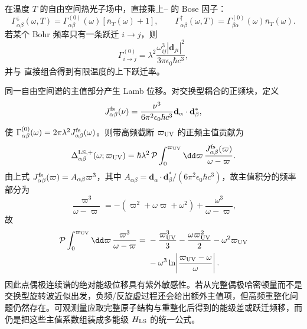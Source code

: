 \begin{exbox}[自由空间多能级电磁场]
在温度 $T$ 的自由空间热光子场中，直接乘上-- 的 Bose 因子：
\begin{equation}
\Gamma_{\alpha\beta}^{\downarrow}(\omega,T)
=\Gamma_{\alpha\beta}^{(0)}(\omega)
[\bar n_T(\omega)+1],
\qquad
\Gamma_{\alpha\beta}^{\uparrow}(\omega,T)
=\Gamma_{\beta\alpha}^{(0)}(\omega)
\bar n_T(\omega).
\label{eq:phys-oqs-free-space-thermal-matrix}
\end{equation}
若某个 Bohr 频率只有一条跃迁 $i\to j$，则
\begin{equation}
\Gamma_{i\to j}^{(0)}
=\lambda^2
\frac{\omega_{ij}^3|\mathbf d_{ji}|^2}
{3\pi\epsilon_0\hbar c^3},
\label{eq:phys-oqs-free-space-single-rate}
\end{equation}
并与 直接组合得到有限温度的上下跃迁率。

同一自由空间谱的主值部分产生 Lamb 位移。对交换型耦合的正频块，定义
\[
J_{\alpha\beta}^{\rm fs}(\nu)
=\frac{\nu^3}{6\pi^2\epsilon_0\hbar c^3}
\mathbf d_\alpha\cdot\mathbf d_\beta^*,
\]
使 $\Gamma_{\alpha\beta}^{(0)}(\omega)=2\pi\lambda^2J_{\alpha\beta}^{\rm fs}(\omega)$。则带高频截断 $\varpi_{\rm UV}$ 的正频主值贡献为
\begin{equation}
\Delta_{\alpha\beta}^{\rm LS,+}(\omega;\varpi_{\rm UV})
=\hbar\lambda^2\,\mathcal P
\int_0^{\varpi_{\rm UV}}\dd\varpi\,
\frac{J_{\alpha\beta}^{\rm fs}(\varpi)}{\omega-\varpi}.
\label{eq:phys-oqs-free-space-ls-general}
\end{equation}
由上式 $J_{\alpha\beta}^{\rm fs}(\varpi)=A_{\alpha\beta}\varpi^3$，其中 $A_{\alpha\beta}=\mathbf d_\alpha\cdot\mathbf d_\beta^*/(6\pi^2\epsilon_0\hbar c^3)$，故主值积分的频率部分为
\[
\frac{\varpi^3}{\omega-\varpi}
=-(\varpi^2+\omega\varpi+\omega^2)
+\frac{\omega^3}{\omega-\varpi},
\]
故
\[
\begin{aligned}
\mathcal P\int_0^{\varpi_{\rm UV}}\dd\varpi\,
\frac{\varpi^3}{\omega-\varpi}
={}&-\frac{\varpi_{\rm UV}^3}{3}
-\frac{\omega\varpi_{\rm UV}^2}{2}
-\omega^2\varpi_{\rm UV}\\
&-\omega^3
\ln\!\left|\frac{\varpi_{\rm UV}-\omega}{\omega}\right|.
\end{aligned}
\]
因此点偶极连续谱的绝对能级位移具有紫外敏感性。若从完整偶极哈密顿量而不是交换型旋转波近似出发，负频/反旋虚过程还会给出额外主值项，但高频重整化问题仍然存在。可观测量应取完整原子结构与重整化后得到的能级差或跃迁频移，而 仍是把这些主值系数组装成多能级 $H_{\rm LS}$ 的统一公式。
\end{exbox}

